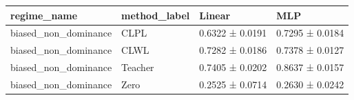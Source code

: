 \begin{tabular}{llll}
\toprule
regime_name & method_label & Linear & MLP \\
\midrule
biased_non_dominance & CLPL & 0.6322 ± 0.0191 & 0.7295 ± 0.0184 \\
biased_non_dominance & CLWL & 0.7282 ± 0.0186 & 0.7378 ± 0.0127 \\
biased_non_dominance & Teacher & 0.7405 ± 0.0202 & 0.8637 ± 0.0157 \\
biased_non_dominance & Zero & 0.2525 ± 0.0714 & 0.2630 ± 0.0242 \\
\bottomrule
\end{tabular}

